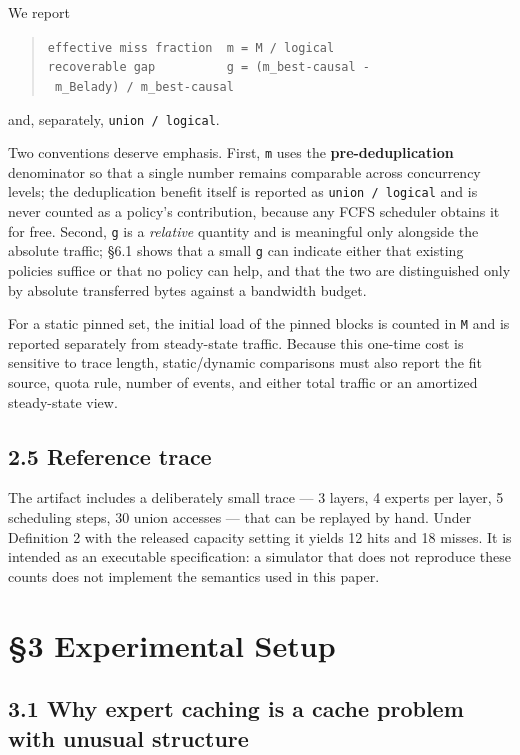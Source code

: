 \documentclass[
  10pt,
  letterpaper,
  10pt]{article}
\begin{document}
We report

\begin{quote}
\texttt{effective\ miss\ fraction\ \ m\ =\ M\ /\ logical}
\texttt{recoverable\ gap\ \ \ \ \ \ \ \ \ \ g\ =\ (m\_best-causal\ -\ m\_Belady)\ /\ m\_best-causal}
\end{quote}

and, separately, \texttt{union\ /\ logical}.

Two conventions deserve emphasis. First, \texttt{m} uses the
\textbf{pre-deduplication} denominator so that a single number remains
comparable across concurrency levels; the deduplication benefit itself
is reported as \texttt{union\ /\ logical} and is never counted as a
policy's contribution, because any FCFS scheduler obtains it for free.
Second, \texttt{g} is a \emph{relative} quantity and is meaningful only
alongside the absolute traffic; §6.1 shows that a small \texttt{g} can
indicate either that existing policies suffice or that no policy can
help, and that the two are distinguished only by absolute transferred
bytes against a bandwidth budget.

For a static pinned set, the initial load of the pinned blocks is
counted in \texttt{M} and is reported separately from steady-state
traffic. Because this one-time cost is sensitive to trace length,
static/dynamic comparisons must also report the fit source, quota rule,
number of events, and either total traffic or an amortized steady-state
view.

\subsection{2.5 Reference trace}\label{reference-trace}

The artifact includes a deliberately small trace --- 3 layers, 4 experts
per layer, 5 scheduling steps, 30 union accesses --- that can be
replayed by hand. Under Definition 2 with the released capacity setting
it yields 12 hits and 18 misses. It is intended as an executable
specification: a simulator that does not reproduce these counts does not
implement the semantics used in this paper.

\section{§3 Experimental Setup}\label{experimental-setup}

\subsection{3.1 Why expert caching is a cache problem with unusual
structure}\label{why-expert-caching-is-a-cache-problem-with-unusual-structure}
\end{document}
